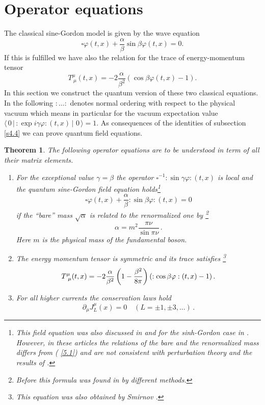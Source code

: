 \documentclass[a4paper,a4paper]{article}
\newtheorem{theorem}{Theorem}
\begin{document}
\section{Operator equations\label{s5}}

The classical sine-Gordon model is given by the wave equation 
\[
\square \varphi (t,x)+\frac{\alpha }{\beta }\sin \beta \varphi (t,x)=0. 
\]
If this is fulfilled we have also the relation for the trace of
energy-momentum tensor 
\[
T_{~\mu }^{\mu }(t,x)=-2\frac{\alpha }{\beta ^{2}}\left( \cos \beta \varphi
(t,x)-1\right) . 
\]
In this section we construct the quantum version of these two classical
equations. In the following $:\dots :$ denotes normal ordering with respect
to the physical vacuum which means in particular for the vacuum expectation
value $\langle \,0\,|\,:\exp i\gamma \varphi :(t,x)\,|\,\,0\,\rangle =1$. As
consequences of the identities of subsection \ref{s4.4} we can prove quantum
field equations.

\begin{theorem}
\label{t4}The following operator equations are to be understood in term of
all their matrix elements.

\begin{enumerate}
\item  For the exceptional value $\gamma =\beta $ the operator $\square
^{-1}:\sin \gamma \varphi :(t,x)$ is local and the quantum sine-Gordon field
equation holds\footnote{\label{c1}This field equation was also discussed in 
\cite{Sm1} and for the sinh-Gordon case in \cite{MS}. However, in these
articles the relations of the bare and the renormalized mass differs from (%
\ref{5.1}) and are not consistent with perturbation theory and the results
of \cite{Fa,AlZa}.} 
\begin{equation}
\square \varphi (t,x)+\frac{\alpha }{\beta }:\sin \beta \varphi :(t,x)=0
\label{e}
\end{equation}
if the ``bare'' mass $\sqrt{\alpha }$ is related to the renormalized one by%
\footnote{%
Before this formula was found in \cite{Fa,AlZa} by different methods.} 
\begin{equation}
\alpha =m^{2}\frac{\pi \nu }{\sin \pi \nu }\,.  \label{5.1}
\end{equation}
Here $m$ is the physical mass of the fundamental boson.

\item  The energy momentum tensor is symmetric and its trace satisfies%
\footnote{%
This equation was also obtained by Smirnov \cite{Sm1}.} 
\begin{equation}
T_{~\mu }^{\mu }(t,x)=-2\frac{\alpha }{\beta ^{2}}\left( 1-\frac{\beta ^{2}}{%
8\pi }\right) \left( :\cos \beta \varphi :(t,x)-1\right) .  \label{T}
\end{equation}

\item  For all higher currents the conservation laws hold 
\[
\partial _{\mu }J_{L}^{\mu }(x)=0\quad (L=\pm 1,\pm 3,\dots )\,.
\]
\end{enumerate}
\end{theorem}
\end{document}
